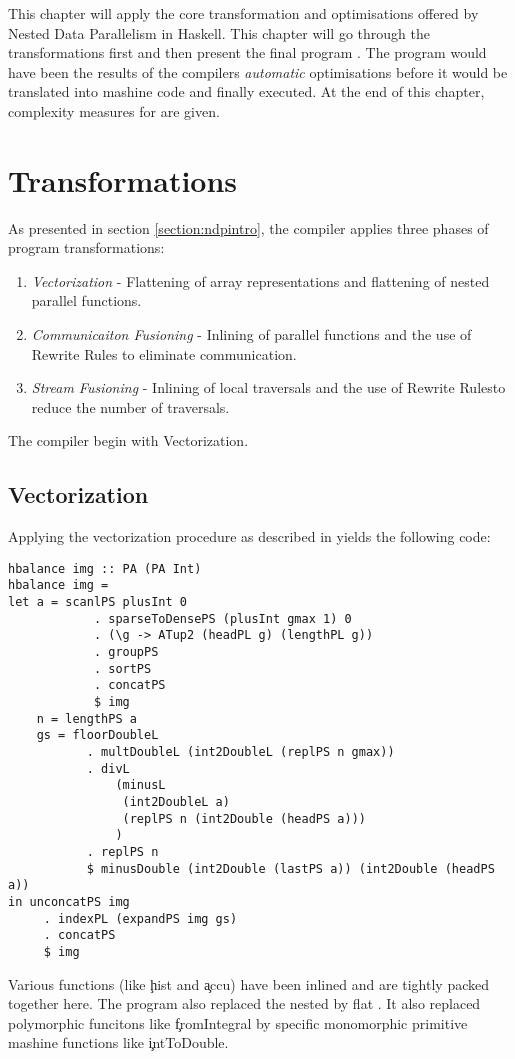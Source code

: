\label{chapter:ndpv}

This chapter will apply the core transformation and optimisations
offered by Nested Data Parallelism in Haskell.
This chapter will go through the transformations first and then present the
final program \ndpv. The program would have been the results of the compilers \textit{automatic}
optimisations before it would be translated into mashine code and finally executed.
At the end of this chapter, complexity measures for \ndpv are given.


\section{Transformations}
  As presented in section \ref{section:ndpintro}, the compiler applies
  three phases of program transformations:
  \begin{enumerate}
    \item \emph{Vectorization} - Flattening of array representations
      and flattening of nested parallel functions.
    \item \emph{Communicaiton Fusioning} - Inlining of parallel
      functions and the use of Rewrite Rules
      to eliminate communication.
    \item \emph{Stream Fusioning} - Inlining of local traversals and
      the use of Rewrite Rulesto reduce the number of traversals.
  \end{enumerate}
  
  The compiler begin with Vectorization.
  
  \subsection{Vectorization}
    Applying the vectorization procedure as described in \cite{Harness2008} yields the following code:
    \begin{lstlisting}
hbalance img :: PA (PA Int)
hbalance img = 
let a = scanlPS plusInt 0
            . sparseToDensePS (plusInt gmax 1) 0
            . (\g -> ATup2 (headPL g) (lengthPL g))
            . groupPS
            . sortPS
            . concatPS
            $ img
    n = lengthPS a
    gs = floorDoubleL
           . multDoubleL (int2DoubleL (replPS n gmax))
           . divL
               (minusL
                (int2DoubleL a)
                (replPS n (int2Double (headPS a)))
               )
           . replPS n
           $ minusDouble (int2Double (lastPS a)) (int2Double (headPS a))
in unconcatPS img
     . indexPL (expandPS img gs)
     . concatPS
     $ img
    \end{lstlisting} %
    Various functions (like \c{hist} and \c{accu}) have been inlined and are tightly packed together here.
    The program also replaced the nested \pan by flat \pav.
    It also replaced polymorphic funcitons like \c{fromIntegral}
    by specific monomorphic primitive mashine functions like \c{intToDouble}.
    

